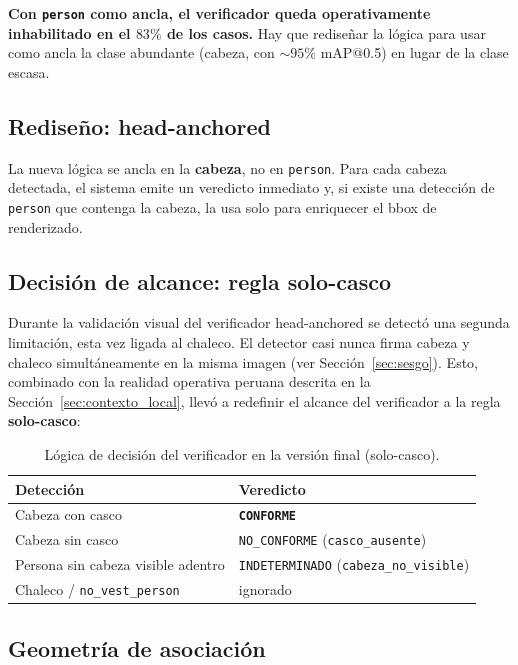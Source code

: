 \documentclass[11pt,a4paper]{article}
\begin{document}
\begin{hallazgo}
\textbf{Con \texttt{person} como ancla, el verificador queda
operativamente inhabilitado en el $83\%$ de los casos.} Hay que
rediseñar la lógica para usar como ancla la clase abundante (cabeza,
con $\sim 95\%$ mAP@0.5) en lugar de la clase escasa.
\end{hallazgo}

\subsection{Rediseño: head-anchored}

La nueva lógica se ancla en la \textbf{cabeza}, no en \texttt{person}.
Para cada cabeza detectada, el sistema emite un veredicto inmediato y,
si existe una detección de \texttt{person} que contenga la cabeza, la
usa solo para enriquecer el bbox de renderizado.

\subsection{Decisión de alcance: regla solo-casco}
\label{sec:decision_alcance}

Durante la validación visual del verificador head-anchored se detectó
una segunda limitación, esta vez ligada al chaleco. El detector casi
nunca firma cabeza y chaleco simultáneamente en la misma imagen (ver
Sección~\ref{sec:sesgo}). Esto, combinado con la realidad operativa
peruana descrita en la Sección~\ref{sec:contexto_local}, llevó a
redefinir el alcance del verificador a la regla \textbf{solo-casco}:

\begin{table}[H]
\centering
\caption{Lógica de decisión del verificador en la versión final
(solo-casco).}
\begin{tabular}{p{5cm} l}
\toprule
\textbf{Detección} & \textbf{Veredicto} \\
\midrule
Cabeza con casco & \textbf{\texttt{CONFORME}} \\
Cabeza sin casco & \texttt{NO\_CONFORME} (\texttt{casco\_ausente}) \\
Persona sin cabeza visible adentro & \texttt{INDETERMINADO}
(\texttt{cabeza\_no\_visible}) \\
Chaleco / \texttt{no\_vest\_person} & ignorado \\
\bottomrule
\end{tabular}
\end{table}

\subsection{Geometría de asociación}
\end{document}
